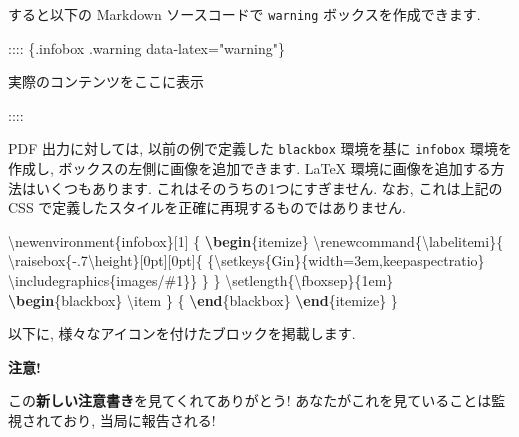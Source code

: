 \documentclass[
  11pt,
  lualatex,
  ja=standard]{bxjsreport}
\newenvironment{Shaded}{\begin{snugshade}}{\end{snugshade}}
\newcommand{\BuiltInTok}[1]{#1}
\newcommand{\ExtensionTok}[1]{#1}
\newcommand{\FunctionTok}[1]{\textcolor[rgb]{0.00,0.00,0.00}{#1}}
\newcommand{\KeywordTok}[1]{\textcolor[rgb]{0.13,0.29,0.53}{\textbf{#1}}}
\newcommand{\NormalTok}[1]{#1}
\newenvironment{infobox}[1]{\begin{itemize}\renewcommand{\labelitemi}{\raisebox{-.7\height}[0pt][0pt]{%
  {\setkeys{Gin}{width=3em,keepaspectratio}\texttt{[image: \_latex/\_img/\#1]}}}}
  \setlength{\fboxsep}{1em}
  \begin{greyblock}
  \item
  }{\end{greyblock}\end{itemize}
}
\begin{document}
すると以下の Markdown ソースコードで \texttt{warning} ボックスを作成できます.

\begin{Shaded}
\begin{Highlighting}[]
\NormalTok{:::: \{.infobox .warning data{-}latex="warning"\}}

\NormalTok{実際のコンテンツをここに表示}

\NormalTok{::::}
\end{Highlighting}
\end{Shaded}

PDF 出力に対しては, 以前の例で定義した \texttt{blackbox} 環境を基に \texttt{infobox} 環境を作成し, ボックスの左側に画像を追加できます. LaTeX 環境に画像を追加する方法はいくつもあります. これはそのうちの1つにすぎません. なお, これは上記の CSS で定義したスタイルを正確に再現するものではありません.

\begin{Shaded}
\begin{Highlighting}[numbers=left,,]
\FunctionTok{\textbackslash{}newenvironment}\NormalTok{\{infobox\}[1]}
\NormalTok{  \{}
  \KeywordTok{\textbackslash{}begin}\NormalTok{\{}\ExtensionTok{itemize}\NormalTok{\}}
  \FunctionTok{\textbackslash{}renewcommand}\NormalTok{\{}\ExtensionTok{\textbackslash{}labelitemi}\NormalTok{\}\{}
    \FunctionTok{\textbackslash{}raisebox}\NormalTok{\{{-}.7}\FunctionTok{\textbackslash{}height}\NormalTok{\}[0pt][0pt]\{}
\NormalTok{      \{}\FunctionTok{\textbackslash{}setkeys}\NormalTok{\{Gin\}\{width=3em,keepaspectratio\}}
        \BuiltInTok{\textbackslash{}includegraphics}\NormalTok{\{}\ExtensionTok{images/\#1}\NormalTok{\}\}}
\NormalTok{    \}}
\NormalTok{  \}}
  \FunctionTok{\textbackslash{}setlength}\NormalTok{\{}\FunctionTok{\textbackslash{}fboxsep}\NormalTok{\}\{1em\}}
  \KeywordTok{\textbackslash{}begin}\NormalTok{\{}\ExtensionTok{blackbox}\NormalTok{\}}
  \FunctionTok{\textbackslash{}item}
\NormalTok{  \}}
\NormalTok{  \{}
  \KeywordTok{\textbackslash{}end}\NormalTok{\{}\ExtensionTok{blackbox}\NormalTok{\}}
  \KeywordTok{\textbackslash{}end}\NormalTok{\{}\ExtensionTok{itemize}\NormalTok{\}}
\NormalTok{  \}}
\end{Highlighting}
\end{Shaded}

以下に, 様々なアイコンを付けたブロックを掲載します.

\begin{infobox}{warning}
\textbf{注意!}

この\textbf{新しい注意書き}を見てくれてありがとう! あなたがこれを見ていることは監視されており, 当局に報告される!

\end{infobox}
\end{document}
